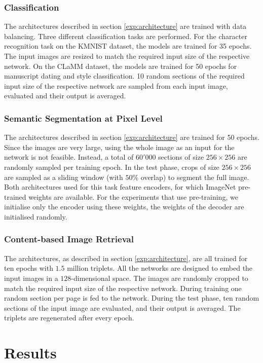 \documentclass[journal]{IEEEtran}
\newcommand{\ls}[1]{{\color{black}#1}}
\newcommand{\vp}[1]{{\color{black}#1}}
\begin{document}
\subsubsection{Classification}
The architectures described in section \ref{exp:architecture} are trained with data balancing.
Three different classification tasks are performed. 
For the character recognition task on the \ac{KMNIST} dataset, the models are trained for 35 epochs. \ls{The input images are resized to match the required input size of the respective network.}
On the \ac{CLaMM} dataset, the models are trained for 50 epochs for manuscript dating and style classification.
\ls{10 random sections of the required input size of the respective network are sampled from each input image, evaluated and their output is averaged.}

\subsubsection{Semantic Segmentation at Pixel Level}
The architectures described in section \ref{exp:architecture} are trained for 50 epochs.
Since the images are very large, using the whole image as an input for the network is not feasible.
Instead, a total of $60'000$ sections of size $256\times256$ are randomly sampled per training epoch. 
In the test phase, crops of size $256\times256$ are sampled as a sliding window (with $50\%$ overlap) to segment the full image. 
Both architectures used for this task feature encoders, for which ImageNet pre-trained weights are available. 
For the experiments that use pre-training, we initialise only the encoder using these weights, the weights of the decoder are initialised randomly. 

\subsubsection{Content-based Image Retrieval}
The architectures, as described in section \ref{exp:architecture}, are all trained for ten epochs \vp{with $1.5$ million triplets.} 
\vp{All the networks are designed to embed the input images in a $128$-dimensional space.}
The images are randomly cropped to match the required input size of the respective network. 
During training one random section per page is fed to the network. During the test phase, ten random sections of the input image are evaluated, and their output is averaged.
The triplets are regenerated after every epoch.

 
\section{Results}
\label{toc:results}
\end{document}
